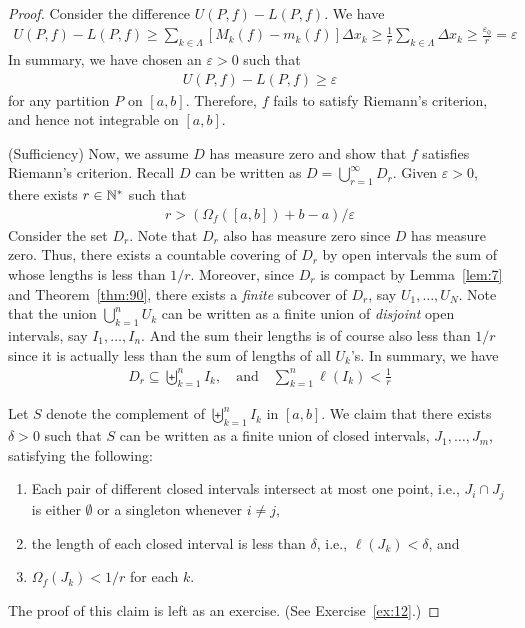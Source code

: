 \documentclass[thmcnt=section, 12pt]{my-elegantbook}
\begin{document}
\begin{proof}
    Consider the difference $U(P,f) - L(P,f)$.
    We have
    \begin{align*}
        U(P,f) - L(P,f)
        \geq \sum_{k \in \Lambda} [M_k(f) - m_k(f)] \Delta x_k
        \geq \frac{1}{r} \sum_{k \in \Lambda} \Delta x_k
        \geq \frac{\varepsilon_0}{r}
        = \varepsilon
    \end{align*}
    In summary, we have chosen an $\varepsilon > 0$ such that
    \begin{align*}
        U(P,f) - L(P,f) \geq \varepsilon
    \end{align*}
    for any partition $P$ on $[a, b]$.
    Therefore, $f$ fails to satisfy Riemann's criterion,
    and hence not integrable on $[a, b]$.

    (Sufficiency)
    Now, we assume $D$ has measure zero and
    show that $f$ satisfies Riemann's criterion.
    Recall $D$ can be written as $D = \bigcup_{r=1}^\infty D_r$.
    Given $\varepsilon > 0$,
    there exists $r \in \mathbb{N}^\ast$ such that
    \begin{align}
        r > (\Omega_f([a,b]) + b - a) / \varepsilon
        \label{eq:148}
    \end{align}
    Consider the set $D_r$.
    Note that $D_r$ also has measure zero since $D$ has measure zero.
    Thus, there exists a countable covering of $D_r$ by open intervals
    the sum of whose lengths is less than $1 / r$.
    Moreover, since $D_r$ is compact by Lemma~\ref{lem:7}
    and Theorem~\ref{thm:90},
    there exists a \textit{finite} subcover of $D_r$,
    say $U_1, \ldots, U_N$.
    Note that the union $\bigcup_{k=1}^n U_k$ can be written as
    a finite union of \textit{disjoint} open intervals,
    say $I_1, \ldots, I_n$.
    And the sum their lengths is of course also less than $1 / r$
    since it is actually less than the sum of lengths of all $U_k$'s.
    In summary, we have
    \begin{align*}
        D_r \subseteq \biguplus_{k=1}^n I_k,
        \quad \text{and} \quad
        \sum_{k=1}^n \ell(I_k) < \frac{1}{r}
    \end{align*}

    Let $S$ denote the complement of $\biguplus_{k=1}^n I_k$ in $[a, b]$.
    We claim that there exists $\delta > 0$
    such that $S$ can be written as a finite union of
    closed intervals, $J_1, \ldots, J_m$, satisfying the following:
    \begin{enumerate}
        \item Each pair of different closed intervals intersect
              at most one point, i.e., $J_i \cap J_j$
              is either $\emptyset$ or a singleton whenever $i \neq j$,
        \item the length of each closed interval is less than $\delta$,
              i.e., $\ell(J_k) < \delta$, and
        \item $\Omega_f(J_k) < 1 / r$ for each $k$.
    \end{enumerate}
    The proof of this claim is left as an exercise.
    (See Exercise~\ref{ex:12}.)


\end{proof}
\end{document}
